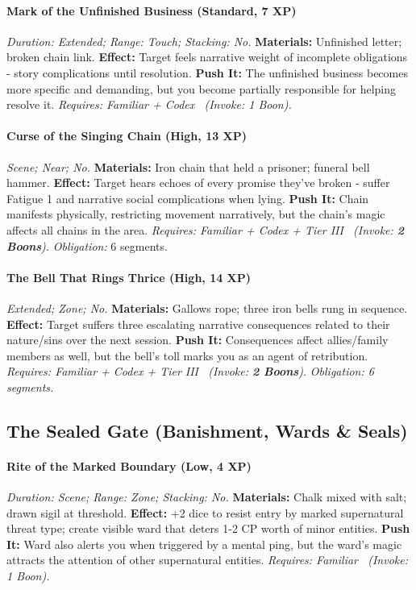 \documentclass[12pt,twoside]{book}
\begin{document}
\paragraph{Mark of the Unfinished Business (Standard, 7 XP)} \emph{Duration: Extended; Range: Touch; Stacking: No.}
\textbf{Materials:} Unfinished letter; broken chain link.
\textbf{Effect:} Target feels narrative weight of incomplete obligations - story complications until resolution.
\textbf{Push It:} The unfinished business becomes more specific and demanding, but you become partially responsible for helping resolve it.
\emph{Requires: Familiar + Codex \ (\textit{Invoke:} 1 Boon).}
\paragraph{Curse of the Singing Chain (High, 13 XP)} \emph{Scene; Near; No.}
\textbf{Materials:} Iron chain that held a prisoner; funeral bell hammer.
\textbf{Effect:} Target hears echoes of every promise they've broken - suffer Fatigue 1 and narrative social complications when lying.
\textbf{Push It:} Chain manifests physically, restricting movement narratively, but the chain's magic affects all chains in the area.
\emph{Requires: Familiar + Codex + Tier III \ (\textit{Invoke:} \textbf{2 Boons}).}
\emph{Obligation:} 6 segments.

\paragraph{The Bell That Rings Thrice (High, 14 XP)} \emph{Extended; Zone; No.}
\textbf{Materials:} Gallows rope; three iron bells rung in sequence.
\textbf{Effect:} Target suffers three escalating narrative consequences related to their nature/sins over the next session.
\textbf{Push It:} Consequences affect allies/family members as well, but the bell's toll marks you as an agent of retribution.
\emph{Requires: Familiar + Codex + Tier III \ (\textit{Invoke:} \textbf{2 Boons}).}
\emph{Obligation: 6 segments.}

\subsection{The Sealed Gate (Banishment, Wards \& Seals)}
\paragraph{Rite of the Marked Boundary (Low, 4 XP)} \emph{Duration: Scene; Range: Zone; Stacking: No.}
\textbf{Materials:} Chalk mixed with salt; drawn sigil at threshold.
\textbf{Effect:} +2 dice to resist entry by marked supernatural threat type; create visible ward that deters 1-2 CP worth of minor entities.
\textbf{Push It:} Ward also alerts you when triggered by a mental ping, but the ward's magic attracts the attention of other supernatural entities.
\emph{Requires: Familiar \ (\textit{Invoke:} 1 Boon).}
\end{document}
